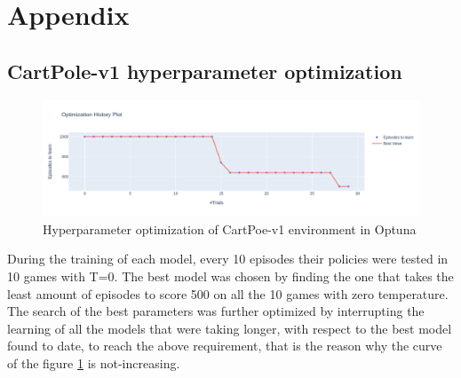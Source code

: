 \documentclass[11pt,a4paper,twocolumn]{IEEEtran}
\begin{document}
			\nocite{brockman2016openai}
			\nocite{mnih2013playing}
			\printbibliography
	\newpage
	\onecolumn
	\section{\textbf{Appendix}}
		\subsection{\textbf{CartPole-v1 hyperparameter optimization}}
		\begin{figure}[h]
			\centering\includegraphics[width=1\linewidth]{../imgs/optuna_cartpole}\vspace*{-.7cm}
			\caption{Hyperparameter optimization of CartPoe-v1 environment in Optuna}
			\label{fig:cartpoleopt}
		\end{figure}
		During the training of each model, every 10 episodes their policies were tested in 10 games with T=0. The best model was chosen by finding the one that takes the least amount of episodes to score 500 on all the 10 games with zero temperature.\medskip\\
		The search of the best parameters was further optimized by interrupting the learning of all the models that were taking longer, with respect to the best model found to date, to reach the above requirement, that is the reason why the curve of the figure \ref{fig:cartpoleopt} is not-increasing.
\end{document}
